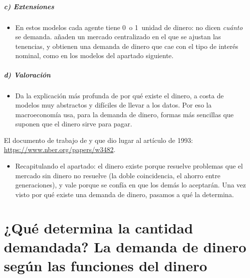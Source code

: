 \documentclass[11pt]{article}
\begin{document}
\subparagraph{c) Extensiones}

\begin{itemize}
\item En estos modelos cada agente tiene 0~o 1~unidad de dinero: no dicen \emph{cuánto} se demanda. \textcite{LagosWright2005Unified} añaden un mercado centralizado en el que se ajustan las tenencias, y obtienen una demanda de dinero que cae con el tipo de interés nominal, como en los modelos del apartado siguiente.
\end{itemize}

\subparagraph{d) Valoración}

\begin{itemize}
\item Da la explicación más profunda de por qué existe el dinero, a costa de modelos muy abstractos y difíciles de llevar a los datos. Por eso la macroeconomía usa, para la demanda de dinero, formas más sencillas que suponen que el dinero sirve para pagar.
\end{itemize}

\begin{anotaciones}
El documento de trabajo de  y  que dio lugar al artículo de 1993: \url{https://www.nber.org/papers/w3482}.
\end{anotaciones}

\begin{itemize}
\item Recapitulando el apartado: el dinero existe porque resuelve problemas que el mercado sin dinero no resuelve (la doble coincidencia, el ahorro entre generaciones), y vale porque se confía en que los demás lo aceptarán. Una vez visto por qué existe una demanda de dinero, pasamos a qué la determina.
\end{itemize}

\section{¿Qué determina la cantidad demandada? La demanda\cortetitulo{} de dinero según las funciones del dinero}\label{sec:determinantes}
\end{document}
